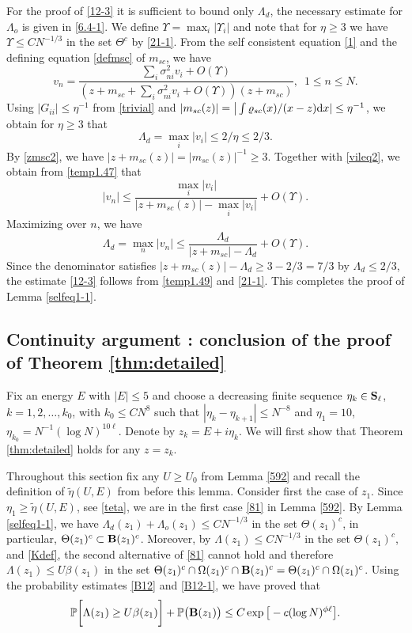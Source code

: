 \documentclass[draft]{article}
\newcommand{\wt}{\widetilde}
\newcommand{\rd}{{\rm d}}
\newcommand{\be}{\begin{equation}}
\newcommand{\ee}{\end{equation}}
\renewcommand{\P}{{\mathbb P}}
\newcommand{\bS}{ {\bf  S}}
\newcommand{\qed}{\hfill\fbox{}\par\vspace{0.3mm}}
\numberwithin{equation}{section}
\numberwithin{theorem}{section}
\numberwithin{definition}{section}
\numberwithin{remark}{section}
\begin{document}
For the proof of \eqref{12-3} it is sufficient to bound only 
$\Lambda_d$, the necessary estimate for $\Lambda_o$ is given in
\eqref{6.4-1}. 
We define  $\Upsilon=\max_i|\Upsilon_i|$
and  note that for $\eta\ge 3$ we have
$\Upsilon\le  CN^{-1/3}$ in the set $\Theta^c$ by  \eqref{21-1}.
{F}rom the self consistent equation \eqref{1} and the 
defining equation \eqref{defmsc} of $m_{sc}$, we have
\be\label{temp1.47}
v_n=\frac{\sum_{i}\sigma^2_{ni}v_i+O(\Upsilon)}{(z+m_{sc}+\sum_{i}\sigma^2_{ni}
v_i+O(\Upsilon))(z+m_{sc})}, \,\,\,1\leq n\leq N.
\ee
Using
 $|G_{ii}|\leq \eta^{-1}$ from \eqref{trivial}
 and $|m_{sc}(z) | =\big| \int \varrho_{sc}(x)/(x-z)\rd x|\leq \eta^{-1}$, we obtain for $\eta\ge 3$ that 
 \be\label{vileq2}
\Lambda_d=\max_i |v_i|\leq 2/\eta\leq 2/3.
 \ee 
By  \eqref{zmsc2}, we have  $|z+m_{sc}(z)| = |m_{sc}(z)|^{-1}\ge 3 $.
 Together with
  \eqref{vileq2}, we obtain from \eqref{temp1.47} that
\be
|v_n|\le\frac{\max_i|v_i|}{|z+m_{sc}(z)|-\max_i|v_i|}+O(\Upsilon).
\ee
Maximizing over $n$, we have  
\be\label{temp1.49}
\Lambda_d = \max_n |v_n|\leq \frac{\Lambda_d }{|z+m_{sc}|-\Lambda_d }+O(\Upsilon).
\ee
Since the  denominator satisfies $|z+m_{sc}(z)|-\Lambda_d\geq 3-2/3=7/3$
by $\Lambda_d\le 2/3$, the estimate \eqref{12-3} 
follows from \eqref{temp1.49}
and \eqref{21-1}. This completes the proof of Lemma \ref{selfeq1-1}.  
\qed
  
 

 
\subsection{Continuity  argument : conclusion of the
 proof of Theorem \ref{thm:detailed}} \label{continuity}


Fix an energy $E$ with $|E| \le 5$ and choose a decreasing
finite sequence $\eta_k\in \bS_\ell$,  $k=1,2,\ldots, k_0$, with $k_0\le CN^{8}$ such that  
$|\eta_k-\eta_{k+1} |\le N^{-8}$ and $\eta_1 = 10$, $\eta_{k_0}= N^{-1}(\log N)^{10 \ell }$.
Denote by $z_k= E + i \eta_k$. We will first show that  Theorem \ref{thm:detailed}
holds for any $z=z_k$. 


Throughout this section fix any $U\ge U_0$ from Lemma \ref{592}
and recall the definition of $\wt\eta(U,E)$ from before this lemma.
Consider first the case of $z_1$. Since $\eta_1\ge \wt\eta(U,E)$, see \eqref{teta}, we are in the
first case \eqref{81} in  Lemma \ref{592}.
By Lemma \ref{selfeq1-1}, we have $\Lambda_d(z_1)+\Lambda_o(z_1)\le CN^{-1/3}$
in the set $\Theta(z_1)^c$, in particular, $\Theta(z_1)^c \subset{\bf B}(z_1)^c $.
Moreover, by $\Lambda(z_1)\le CN^{-1/3}$ in the set $\Theta(z_1)^c$, and \eqref{Kdef}, 
  the second alternative of \eqref{81} cannot hold
and therefore $\Lambda(z_1)\le U\beta(z_1)$
in the set $\Theta(z_1)^c\cap \Omega(z_1)^c\cap {\bf B}(z_1)^c =\Theta(z_1)^c\cap \Omega(z_1)^c $.
Using the probability estimates \eqref{B12} and \eqref{B12-1},
we have proved that 
\be
\P \bigg [  \Lambda (z_1)  \ge U \beta(z_1)
  \bigg ] + \P\big( {\bf B}(z_1)\big) \le C\exp{\big[-c(\log N)^{\phi \ell } \big]}.
\label{eta1}
\ee
\end{document}
